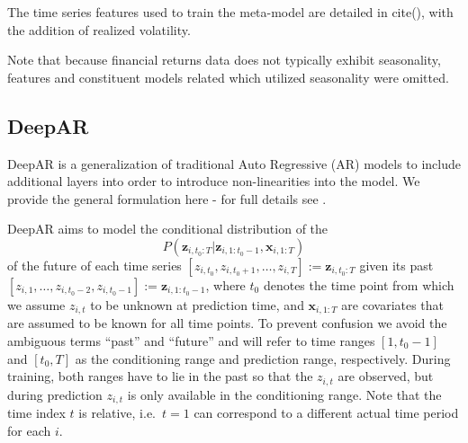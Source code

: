 \documentclass{article}
\newcommand{\z}[2]{z_{#1, #2}}
\newcommand{\zVec}[3]{\mathbf{z}_{#1, #2:#3}}
\newcommand{\xVec}[3]{\mathbf{x}_{#1, #2:#3}}
\begin{document}
The time series features used to train the meta-model are detailed in cite(), with the addition of realized volatility.

Note that because financial returns data does not typically exhibit seasonality, features and constituent models related which utilized seasonality were omitted.

\subsection{DeepAR}
DeepAR is a generalization of traditional Auto Regressive (AR) models to include additional layers into order to introduce non-linearities into the model. We provide the general formulation here - for full details see \cite{salinas_deepar_2019}.


DeepAR aims to model the conditional distribution of the 
\begin{equation*}
P(\zVec{i}{t_0}{T} | \zVec{i}{1}{t_0-1}, \xVec{i}{1}{T})
\label{eq:condDist}
\end{equation*}
of the future of each
time series $[\z{i}{t_0}, \z{i}{t_0 + 1}, \ldots, \z{i}{T}] := \zVec{i}{t_0}{T}$ given its 
\hbox{past $[\z{i}{1}, \ldots, \z{i}{t_0-2}, \z{i}{t_0-1}] := \zVec{i}{1}{t_0-1}$},
where $t_0$ denotes the time point from which we assume $\z{i}{t}$ to be unknown at prediction time,
and $\xVec{i}{1}{T}$ are covariates that are assumed to be known for all time points. To prevent
confusion we avoid the ambiguous terms ``past'' and ``future'' and will refer to time ranges $[1, t_0-1]$ and $[t_0, T]$ as the conditioning range and 
prediction range, respectively. During training, both ranges have to lie in the past so that the $\z{i}{t}$ are observed, but during prediction $\z{i}{t}$
is only available in the conditioning range. Note that the time index $t$ is relative, i.e.\ $t=1$ can correspond to a different actual
time period for each $i$. 

\newcommand{\modelDist}{Q_\Theta(\zVec{i}{t_0}{T} | \zVec{i}{1}{t_0-1}, \xVec{i}{1}{T})}
\end{document}
